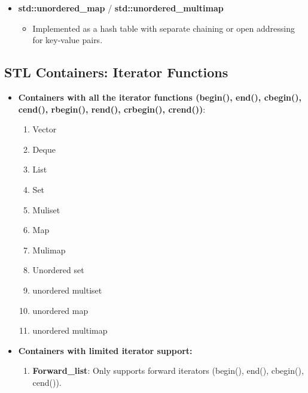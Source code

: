 \documentclass{report}
\begin{document}
\begin{itemize}
    \item \textbf{std::unordered\_map} / \textbf{std::unordered\_multimap}
    \begin{itemize}
        \item Implemented as a hash table with separate chaining or open addressing for key-value pairs.
    \end{itemize}
\end{itemize}


\pagebreak 
\subsection{STL Containers: Iterator Functions}
\begin{itemize}
    \item \textbf{Containers with all the iterator functions (begin(), end(), cbegin(), cend(), rbegin(), rend(), crbegin(), crend())}: 
        \begin{enumerate}
            \item Vector
            \item Deque
            \item List
            \item Set 
            \item Muliset
            \item Map
            \item Mulimap
            \item Unordered set
            \item unordered multiset
            \item unordered map
            \item unordered multimap
        \end{enumerate}
    \item \textbf{Containers with limited iterator support:}
        \begin{enumerate}
            \item \textbf{Forward\_list}: Only supports forward iterators (begin(), end(), cbegin(), cend()).
        \end{enumerate}
\end{itemize}


   \pagebreak 
\end{document}
